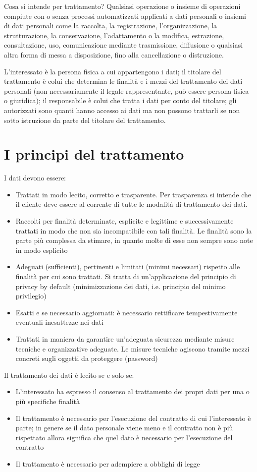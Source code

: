 Cosa si intende per trattamento? Qualsiasi operazione o insieme di operazioni compiute con o senza processi automatizzati applicati a dati personali o insiemi di dati personali come la raccolta, la registrazione, l'organizzazione, la strutturazione, la conservazione, l'adattamento o la modifica, estrazione, consultazione, uso, comunicazione mediante trasmissione, diffusione o qualsiasi altra forma di messa a disposizione, fino alla cancellazione o distruzione.

L'interessato è la persona fisica a cui appartengono i dati; il titolare del trattamento è colui che determina le finalità e i mezzi del trattamento dei dati personali (non necessariamente il legale rappresentante, può essere persona fisica o giuridica); il responsabile è colui che tratta i dati per conto del titolare; gli autorizzati sono quanti hanno accesso ai dati ma non possono trattarli se non sotto istruzione da parte del titolare del trattamento.

\section{I principi del trattamento}
I dati devono essere:
\begin{itemize}
    \item Trattati in modo lecito, corretto e trasparente. Per trasparenza si intende che il cliente deve essere al corrente di tutte le modalità di trattamento dei dati. 
    \item Raccolti per finalità determinate, esplicite e legittime e successivamente trattati in modo che non sia incompatibile con tali finalità. Le finalità sono la parte più complessa da stimare, in quanto molte di esse non sempre sono note in modo esplicito
    \item Adeguati (sufficienti), pertinenti e limitati (minimi necessari) rispetto alle finalità per cui sono trattati. Si tratta di un'applicazione del principio di privacy by default (minimizzazione dei dati, i.e. principio del minimo privilegio)
    \item Esatti e se necessario aggiornati: è necessario rettificare tempestivamente eventuali inesattezze nei dati
    \item Trattati in maniera da garantire un'adeguata sicurezza mediante misure tecniche e organizzative adeguate. Le misure tecniche agiscono tramite mezzi concreti sugli oggetti da proteggere (password)
\end{itemize}

Il trattamento dei dati è lecito se e solo se:
\begin{itemize}
    \item L'interessato ha espresso il consenso al trattamento dei propri dati per una o più specifiche finalità
    \item Il trattamento è necessario per l'esecuzione del contratto di cui l'interessato è parte; in genere se il dato personale viene meno e il contratto non è più rispettato allora significa che quel dato è necessario per l'esecuzione del contratto
    \item Il trattamento è necessario per adempiere a obblighi di legge
\end{itemize}

